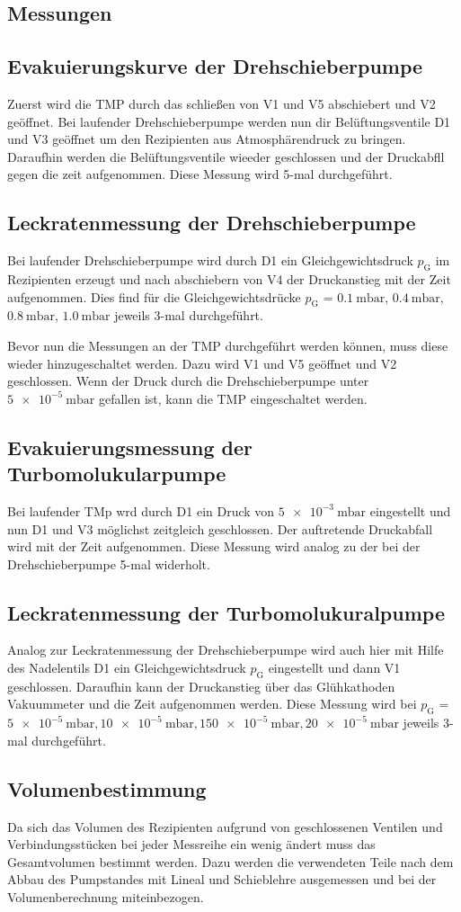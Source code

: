 \subsection{Messungen}
\subsection{Evakuierungskurve der Drehschieberpumpe}
Zuerst wird die TMP durch das schließen von V1 und V5 abschiebert und V2 geöffnet.
Bei laufender Drehschieberpumpe werden nun dir Belüftungsventile D1 und V3 geöffnet
um den Rezipienten aus Atmosphärendruck zu bringen. Daraufhin werden die Belüftungsventile
wieeder geschlossen und der Druckabfll gegen die zeit aufgenommen. Diese Messung wird
5-mal durchgeführt.
\subsection{Leckratenmessung der Drehschieberpumpe}
Bei laufender Drehschieberpumpe wird durch D1 ein Gleichgewichtsdruck $p_\text{G}$
im Rezipienten erzeugt und nach abschiebern von V4 der Druckanstieg mit der Zeit
aufgenommen. Dies find für die Gleichgewichtsdrücke $p_\text{G}$ = {$\SI{0.1}{\milli\bar}$,
$\SI{0.4}{\milli\bar}$, $\SI{0.8}{\milli\bar}$, $\SI{1.0}{\milli\bar}$} jeweils 3-mal
durchgeführt.

Bevor nun die Messungen an der TMP durchgeführt werden können, muss diese wieder
hinzugeschaltet werden. Dazu wird V1 und V5 geöffnet und V2 geschlossen. Wenn der
Druck durch die Drehschieberpumpe unter $\SI{5e-5}{\milli\bar}$ gefallen ist, kann
die TMP eingeschaltet werden.
\subsection{Evakuierungsmessung der Turbomolukularpumpe}
Bei laufender TMp wrd durch D1 ein Druck von $\SI{5e-3}{\milli\bar}$ eingestellt
und nun D1 und V3 möglichst zeitgleich geschlossen. Der auftretende Druckabfall
wird mit der Zeit aufgenommen. Diese Messung wird analog zu der bei der Drehschieberpumpe
5-mal widerholt.
\subsection{Leckratenmessung der Turbomolukuralpumpe}
Analog zur Leckratenmessung  der Drehschieberpumpe wird auch hier mit Hilfe des Nadelentils
D1 ein Gleichgewichtsdruck $p_\text{G}$ eingestellt und dann V1 geschlossen. Daraufhin
kann der Druckanstieg über das Glühkathoden Vakuummeter und die Zeit aufgenommen werden.
Diese Messung wird bei $p_\text{G}$ = ${\SI{5e-5}{\milli\bar}, \SI{10e-5}{\milli\bar},
\SI{150e-5}{\milli\bar}, \SI{20e-5}{\milli\bar}}$ jeweils 3-mal durchgeführt.

\subsection{Volumenbestimmung}
Da sich das Volumen des Rezipienten aufgrund von geschlossenen Ventilen und Verbindungsstücken
bei jeder Messreihe ein wenig ändert muss das Gesamtvolumen bestimmt werden. Dazu werden
die verwendeten Teile nach dem Abbau des Pumpstandes mit Lineal und Schieblehre ausgemessen
und bei der Volumenberechnung miteinbezogen.

